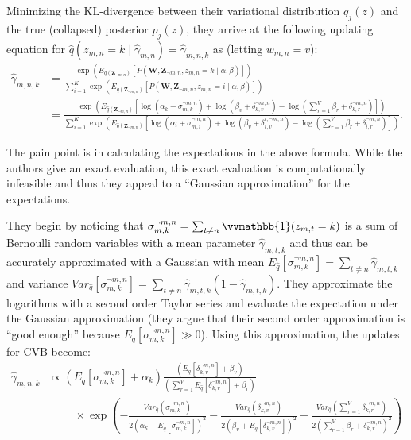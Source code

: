 \documentclass[11pt]{article}
\newcommand{\indicator}{\vvmathbb{1}}
\begin{document}
Minimizing the KL-divergence between their variational distribution $q_j(z)$
and the true (collapsed) posterior $p_j(z)$, they arrive at the following
updating equation for $\hat{q}(z_{m,n} = k \mid \hat{\gamma}_{m,n}) =
\hat{\gamma}_{m,n,k}$ as (letting $w_{m,n} = v$):
\begin{align}
  \hat{\gamma}_{m,n,k} &=
  \frac{\exp\left(E_{\hat{q}(\mathbf{Z}_{\neg m,n})}\left[P(\mathbf{W},
  \mathbf{Z}_{\neg m,n}, z_{m,n} = k \mid \alpha, \beta)\right]\right)}
  {\sum_{i=1}^K \exp\left(E_{\hat{q}(\mathbf{Z}_{\neg m,n})}\left[P(\mathbf{W},
  \mathbf{Z}_{\neg m,n}, z_{m,n} = i \mid \alpha, \beta)\right]\right)}\\
  &= \frac{\exp\left(E_{\hat{q}(\mathbf{Z}_{\neg m,n})}\left[
  \log(\alpha_k + \sigma_{m,k}^{\neg m,n})
  + \log(\beta_v + \delta_{k,v}^{\neg m,n})
  - \log(\sum_{r=1}^V \beta_r + \delta_{k,r}^{\neg m,n})\right]\right)}
  {\sum_{i=1}^K \exp\left(E_{\hat{q}(\mathbf{Z}_{\neg m,n})}\left[
      \log(\alpha_i + \sigma_{m,i}^{\neg m,n})
      + \log(\beta_v + \delta_{i,v}^{i,\neg m,n})
    - \log(\sum_{r=1}^V \beta_r + \delta_{i,r}^{\neg m,n})
  \right]\right)}.
\end{align}

The pain point is in calculating the expectations in the above formula.
While the authors give an exact evaluation, this exact evaluation is
computationally infeasible and thus they appeal to a ``Gaussian
approximation'' for the expectations.

They begin by noticing that $\sigma_{m,k}^{\neg m,n} = \sum_{t \neq n}
\indicator(z_{m,t} = k)$ is a sum of Bernoulli random variables with a mean
parameter $\hat{\gamma}_{m,t,k}$ and thus can be accurately approximated
with a Gaussian with mean $E_{\hat{q}}[\sigma_{m,k}^{\neg m,n}] =
\sum_{t\neq n} \hat{\gamma}_{m,t,k}$ and variance
$Var_{\hat{q}}[\sigma_{m,k}^{\neg m,n}] = \sum_{t\neq n}
\hat{\gamma}_{m,t,k}(1-\hat{\gamma}_{m,t,k})$. They approximate the
logarithms with a second order Taylor series and evaluate the expectation
under the Gaussian approximation (they argue that their second order
approximation is ``good enough'' because $E_{\hat{q}}[\sigma_{m,k}^{\neg
m,n}] \gg 0$). Using this approximation, the updates for CVB become:
\begin{align}
  \hat{\gamma}_{m,n,k} &\propto
  \left(E_{\hat{q}}[\sigma_{m,k}^{\neg m,n}] + \alpha_k\right)
  \frac{\left(E_{\hat{q}}[\delta_{k,v}^{\neg m,n}] + \beta_v\right)}
  {\left(\sum_{r=1}^V E_{\hat{q}}[\delta_{k,r}^{\neg m,n}] +
  \beta_r\right)}\nonumber\\
  &\quad\quad\;
  \times\exp\left(
    -\frac{Var_{\hat{q}}(\sigma_{m,k}^{\neg m,n})}
    {2\left(\alpha_k + E_{\hat{q}}[\sigma_{m,k}^{\neg m,n}]\right)^2}
    -\frac{Var_{\hat{q}}(\delta_{k,v}^{\neg m,n})}
    {2\left(\beta_v + E_{\hat{q}}[\delta_{k,v}^{\neg m,n}]\right)^2}
    +\frac{Var_{\hat{q}}\left(\sum_{r=1}^V \delta_{k,r}^{\neg m,n}\right)}
    {2\left(\sum_{r=1}^V \beta_r + \delta_{k,r}^{\neg m,n}\right)^2}
  \right)
  \label{eqn:cvb}
\end{align}
\end{document}
